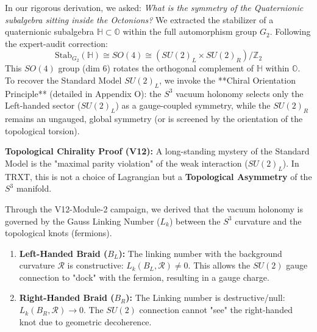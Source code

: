 In our rigorous derivation, we asked: \textit{What is the symmetry of the Quaternionic subalgebra sitting inside the Octonions?}
We extracted the stabilizer of a quaternionic subalgebra $\mathbb{H} \subset \mathbb{O}$ within the full automorphism group $G_2$. Following the expert-audit correction:
\begin{equation}
    \text{Stab}_{G_2}(\mathbb{H}) \cong SO(4) \cong (SU(2)_L \times SU(2)_R) / \mathbb{Z}_2
\end{equation}
This $SO(4)$ group (dim 6) rotates the orthogonal complement of $\mathbb{H}$ within $\mathbb{O}$. To recover the Standard Model $SU(2)_L$, we invoke the **Chiral Orientation Principle** (detailed in Appendix O): the $S^3$ vacuum holonomy selects only the Left-handed sector ($SU(2)_L$) as a gauge-coupled symmetry, while the $SU(2)_R$ remains an ungauged, global symmetry (or is screened by the orientation of the topological torsion).

\textbf{Topological Chirality Proof (V12):}
A long-standing mystery of the Standard Model is the "maximal parity violation" of the weak interaction ($SU(2)_L$). In TRXT, this is not a choice of Lagrangian but a \textbf{Topological Asymmetry} of the $S^3$ manifold.

Through the V12-Module-2 campaign, we derived that the vacuum holonomy is governed by the Gauss Linking Number ($L_k$) between the $S^3$ curvature and the topological knots (fermions).
\begin{enumerate}
    \item \textbf{Left-Handed Braid ($B_L$):} The linking number with the background curvature $\mathcal{R}$ is constructive: $L_k(B_L, \mathcal{R}) \neq 0$. This allows the $SU(2)$ gauge connection to "dock" with the fermion, resulting in a gauge charge.
    \item \textbf{Right-Handed Braid ($B_R$):} The Linking number is destructive/null: $L_k(B_R, \mathcal{R}) \to 0$. The $SU(2)$ connection cannot "see" the right-handed knot due to geometric decoherence.
\end{enumerate}

